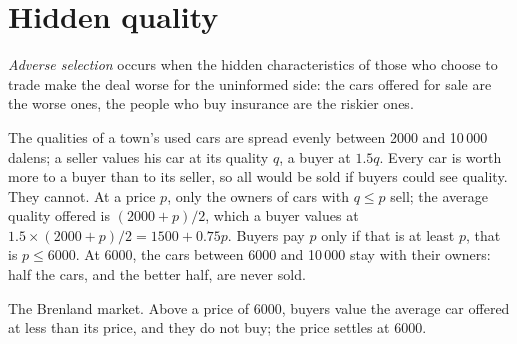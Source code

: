 \section{Hidden quality}\label{sec:g11:asymmetric-information:lemons}

\begin{definition}\label{def:g11:asymmetric-information:adverse-selection}
\emph{Adverse selection} occurs when the hidden characteristics of those who choose to trade make the deal worse for the uninformed side:
the cars offered for sale are the worse ones, the people who buy insurance are the riskier ones.
\end{definition}

\begin{example}\label{ex:g11:asymmetric-information:cars}
The qualities of a town's used cars are spread evenly between 2000 and 10\,000 dalens; a seller values his car at its quality $q$, a buyer at $1.5q$. Every car is worth
more to a buyer than to its seller, so all would be sold if buyers could see quality. They cannot. At a price $p$, only the owners of cars with $q \le p$ sell; the
average quality offered is $(2000 + p)/2$, which a buyer values at $1.5 \times (2000 + p)/2 = 1500 + 0.75p$. Buyers pay $p$ only if that is at least $p$, that is
$p \le 6000$. At 6000, the cars between 6000 and 10\,000 stay with their owners: half the cars, and the better half, are never sold.
\end{example}

\begin{omfigure}

{\small The Brenland market. Above a price of 6000, buyers value the average car offered at less than its price, and they do not buy; the price settles at 6000.}
\end{omfigure}

